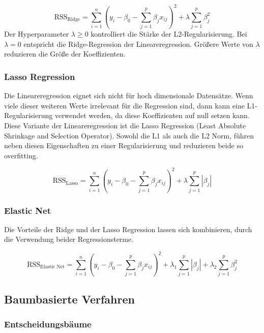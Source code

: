 \begin{equation}
\text{RSS}_{\text{Ridge}} = \sum_{i=1}^{n}(y_i - \beta_0 - \sum_{j=1}^{p}\beta_j x_{ij})^2 + \lambda \sum_{j=1}^{p}\beta_j^2
\label{eq:rss-ridge}
\end{equation}
Der Hyperparameter \(\lambda \geq 0\) kontrolliert die Stärke der L2-Regularisierung. Bei \(\lambda = 0\) entspricht die Ridge-Regression der Lineareregression. Größere Werte von \(\lambda \) reduzieren die Größe der Koeffizienten.

\subsubsection{Lasso Regression}
Die Lineareregression eignet sich nicht für hoch dimensionale Datensätze. Wenn viele dieser weiteren Werte irrelevant für die Regression sind, dann kann eine L1-Regularisierung verwendet werden, da diese Koeffizienten auf null setzen kann. Diese Variante der Lineareregression ist die Lasso Regression (Least Absolute Shrinkage and Selection Operator). Sowohl die L1 als auch die L2 Norm, führen neben diesen Eigenschaften zu einer Regularisierung und reduzieren beide so overfitting.

\begin{equation}
\text{RSS}_{\text{Lasso}} = \sum_{i=1}^{n}(y_i - \beta_0 - \sum_{j=1}^{p}\beta_j x_{ij})^2 + \lambda \sum_{j=1}^{p}|\beta_j|
\label{eq:reg-lasso}
\end{equation}

\subsubsection{Elastic Net}
Die Vorteile der Ridge und der Lasso Regression lassen sich kombinieren, durch die Verwendung beider Regressionsterme.

\begin{equation}
\text{RSS}_{\text{Elastic Net}} = \sum_{i=1}^{n}(y_i - \beta_0 - \sum_{j=1}^{p}\beta_j x_{ij})^2 + \lambda_1 \sum_{j=1}^{p}|\beta_j| + \lambda_2 \sum_{j=1}^{p}\beta_j^2
\label{eq:reg-elastic}
\end{equation}

\subsection{Baumbasierte Verfahren}

\subsubsection{Entscheidungsbäume}

